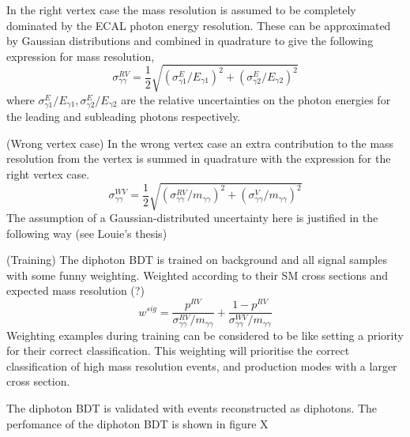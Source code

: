 
In the right vertex case the mass resolution is assumed to be completely dominated by the ECAL photon energy resolution. 
These can be approximated by Gaussian distributions and combined in quadrature to give the following expression for mass resolution,
\begin{equation}
    \sigma^{RV}_{\gamma\gamma} = \frac{1}{2}\sqrt{(\sigma^{E}_{\gamma{1}}/E_{\gamma{1}})^2 + (\sigma^{E}_{\gamma{2}}/E_{\gamma{2}})^2}
\end{equation} 
where $\sigma^{E}_{\gamma{1}}/E_{\gamma{1}}, \sigma^{E}_{\gamma{2}}/E_{\gamma{2}}$ are the relative uncertainties on the photon energies for the leading and subleading photons respectively. 

(Wrong vertex case)
In the wrong vertex case an extra contribution to the mass resolution from the vertex is summed in quadrature with the expression for the right vertex case. 
\begin{equation}
    \sigma^{WV}_{\gamma\gamma} = \frac{1}{2}\sqrt{(\sigma^{RV}_{\gamma\gamma}/m_{\gamma\gamma})^2 + (\sigma^{V}_{\gamma\gamma}/m_{\gamma\gamma})^2}
\end{equation} 
The assumption of a Gaussian-distributed uncertainty here is justified in the following way 
(see Louie's thesis)


(Training)
The diphoton BDT is trained on background and all signal samples with some funny weighting. 
Weighted according to their SM cross sections and expected mass resolution (?)
\begin{equation}
    w^{sig} = \frac{p^{RV}}{\sigma^{RV}_{\gamma\gamma}/m_{\gamma\gamma}} + \frac{1-p^{RV}}{\sigma^{WV}_{\gamma\gamma}/m_{\gamma\gamma}}
\end{equation} 
Weighting examples during training can be considered to be like setting a priority for their correct classification. 
This weighting will prioritise the correct classification of high mass resolution events, and production modes with a larger cross section. 

The diphoton BDT is validated with \Zee events reconstructed as diphotons. The perfomance of the diphoton BDT is shown in figure X



